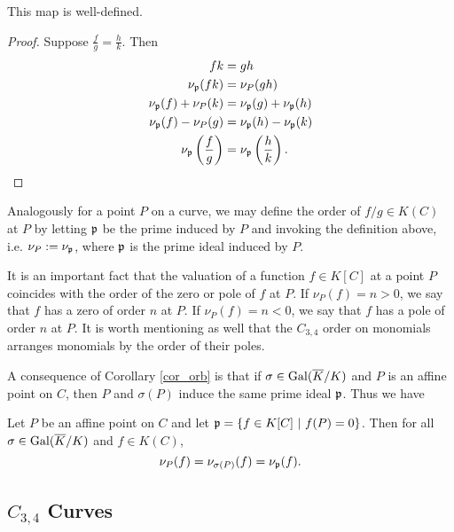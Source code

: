 \begin{proposition}
  This map is well-defined.
\end{proposition}
\begin{proof}
  Suppose $\frac f g = \frac h k$. Then
  \begin{align*}
    fk &= gh \\
    \nu_{\frak p}(fk) &= \nu_P(gh) \\
    \nu_{\frak p}(f) + \nu_P(k) &= \nu_{\frak p}(g) + \nu_{\frak p}(h) \\
    \nu_{\frak p}(f) - \nu_P(g) &= \nu_{\frak p}(h) - \nu_{\frak p}(k) \\
    \nu_{\frak p}\left(\frac f g\right) &= \nu_{\frak p}\left(\frac h k\right).
  \end{align*}
\end{proof}

Analogously for a point $P$ on a curve,
we may define the order of $f/g \in K(C)$ at $P$
by letting $\frak p$ be the prime induced by $P$ and invoking the definition above,
i.e. $\nu_P := \nu_{\frak p}$, where $\frak p$ is the prime ideal induced by $P$.

It is an important fact that the valuation of a function $f \in K[C]$ at a point $P$
coincides with the order of the zero or pole of $f$ at $P$.
If $\nu_P(f) = n > 0$, we say that $f$ has a zero of order $n$ at $P$.
If $\nu_P(f) = n < 0$, we say that $f$ has a pole of order $n$ at $P$.
It is worth mentioning as well that the $C_{3,4}$ order on monomials arranges monomials by the order of their poles.

A consequence of Corollary \ref{cor_orb} is that if $\sigma \in \operatorname{Gal}(\overline K/K)$ and $P$ is an affine point on $C$,
then $P$ and $\sigma(P)$ induce the same prime ideal $\frak p$. Thus we have
\begin{proposition}
  \label{prop_valuation_on_orbit}
  Let $P$ be an affine point on $C$ and let $\frak p = \{ f \in K[C] ~|~ f(P) = 0 \}$.
  Then for all $\sigma \in \operatorname{Gal}(\overline K/K)$ and $f \in K(C)$,
  \[ \nu_P(f) = \nu_{\sigma(P)}(f) = \nu_{\frak p}(f). \]
\end{proposition}





\subsection{$C_{3,4}$ Curves}

